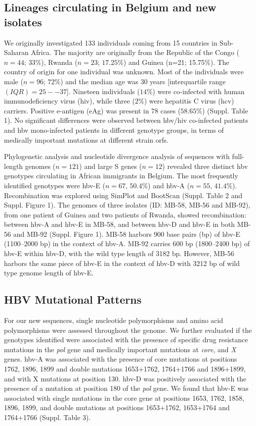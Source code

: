 \subsection{Lineages circulating in Belgium and new isolates}
We originally investigated 133 individuals coming from 15 countries in Sub-Saharan Africa.
The majority are originally from the Republic of the Congo ($n=44$; $33\%$), Rwanda ($n=23$; $17.25\%$) and Guinea (n=21; 15.75\%).
The country of origin for one individual was unknown.
Most of the individuals were male ($n=96$; $72\%$) and the median age was 30 years [interquartile range $(IQR) = 25--37$].
Nineteen individuals ($14\%$) were co-infected with human immunodeficiency virus (\gls{hiv}), while three ($2\%$) were hepatitis C virus (\gls{hcv}) carriers.
Positive e-antigen (eAg) was present in 78 cases ($58.65\%$) (Suppl. Table 1).
No significant differences were observed between \gls{hbv}/\gls{hiv} co-infected patients and \gls{hbv} mono-infected patients in different genotype groups, in terms of medically important mutations at different strain \gls{orf}s.

Phylogenetic analysis and nucleotide divergence analysis of sequences with full-length genomes ($n=121$) and large S genes ($n=12$) revealed three distinct \gls{hbv} genotypes circulating in African immigrants in Belgium.
The most frequently identified genotypes were \gls{hbv}-E ($n=67$, $50.4\%$) and \gls{hbv}-A ($n=55$, $41.4\%$).
Recombination was explored using SimPlot and BootScan (Suppl. Table 2 and Suppl. Figure 1).
The genomes of three isolates (ID: MB-58, MB-56 and MB-92), from one patient of Guinea and two patients of Rwanda, showed recombination: between \gls{hbv}-A and \gls{hbv}-E in MB-58, and between \gls{hbv}-D and \gls{hbv}-E in both MB-56 and MB-92 (Suppl. Figure 1).
MB-58 harbors 900 base pairs (bp) of \gls{hbv}-E (1100--2000 bp) in the context of \gls{hbv}-A.
MB-92 carries 600 bp (1800--2400 bp) of \gls{hbv}-E within \gls{hbv}-D, with the wild type length of 3182 bp.
However, MB-56 harbors the same piece of \gls{hbv}-E in the context of \gls{hbv}-D with 3212 bp of wild type genome length of \gls{hbv}-E.

\subsection{HBV Mutational Patterns}
For our new sequences, single nucleotide polymorphisms and amino acid polymorphisms were assessed throughout the genome.
We further evaluated if the genotypes identified were associated with the presence of specific drug resistance mutations in the \textit{pol} gene and medically important mutations at \textit{core}, and \textit{X} genes.
\gls{hbv}-A was associated with the presence of core mutations at positions 1762, 1896, 1899 and double mutations 1653+1762, 1764+1766 and 1896+1899, and with X mutations at position 130.
\gls{hbv}-D was positively associated with the presence of a mutation at position 180 of the \textit{pol} gene.
We found that \gls{hbv}-E was associated with single mutations in the core gene at positions 1653, 1762, 1858, 1896, 1899, and double mutations at positions 1653+1762, 1653+1764 and 1764+1766 (Suppl. Table 3).

